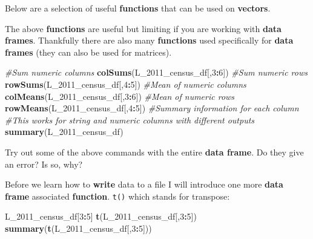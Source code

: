 \documentclass[]{book}
\newenvironment{Shaded}{\begin{snugshade}}{\end{snugshade}}
\newcommand{\KeywordTok}[1]{\textcolor[rgb]{0.13,0.29,0.53}{\textbf{#1}}}
\newcommand{\DecValTok}[1]{\textcolor[rgb]{0.00,0.00,0.81}{#1}}
\newcommand{\CommentTok}[1]{\textcolor[rgb]{0.56,0.35,0.01}{\textit{#1}}}
\newcommand{\OperatorTok}[1]{\textcolor[rgb]{0.81,0.36,0.00}{\textbf{#1}}}
\newcommand{\NormalTok}[1]{#1}
\begin{document}
Below are a selection of useful \textbf{functions} that can be used on
\textbf{vectors}.

\begin{Shaded}
\end{Shaded}

The above \textbf{functions} are useful but limiting if you are working
with \textbf{data frames}. Thankfully there are also many
\textbf{functions} used specifically for \textbf{data frames} (they can
also be used for matrices).

\begin{Shaded}
\begin{Highlighting}[]
\CommentTok{#Sum numeric columns}
\KeywordTok{colSums}\NormalTok{(L_2011_census_df[,}\DecValTok{3}\OperatorTok{:}\DecValTok{6}\NormalTok{])}
\CommentTok{#Sum numeric rows}
\KeywordTok{rowSums}\NormalTok{(L_2011_census_df[,}\DecValTok{4}\OperatorTok{:}\DecValTok{5}\NormalTok{])}
\CommentTok{#Mean of numeric columns}
\KeywordTok{colMeans}\NormalTok{(L_2011_census_df[,}\DecValTok{3}\OperatorTok{:}\DecValTok{6}\NormalTok{])}
\CommentTok{#Mean of numeric rows}
\KeywordTok{rowMeans}\NormalTok{(L_2011_census_df[,}\DecValTok{4}\OperatorTok{:}\DecValTok{5}\NormalTok{])}
\CommentTok{#Summary information for each column}
\CommentTok{#This works for string and numeric columns with different outputs}
\KeywordTok{summary}\NormalTok{(L_2011_census_df)}
\end{Highlighting}
\end{Shaded}

Try out some of the above commands with the entire \textbf{data frame}.
Do they give an error? Is so, why?

Before we learn how to \textbf{write} data to a file I will introduce
one more \textbf{data frame} associated \textbf{function}. \texttt{t()}
which stands for transpose:

\begin{Shaded}
\begin{Highlighting}[]
\NormalTok{L_2011_census_df[}\DecValTok{3}\OperatorTok{:}\DecValTok{5}\NormalTok{]}
\KeywordTok{t}\NormalTok{(L_2011_census_df[,}\DecValTok{3}\OperatorTok{:}\DecValTok{5}\NormalTok{])}
\KeywordTok{summary}\NormalTok{(}\KeywordTok{t}\NormalTok{(L_2011_census_df[,}\DecValTok{3}\OperatorTok{:}\DecValTok{5}\NormalTok{]))}
\end{Highlighting}
\end{Shaded}
\end{document}
